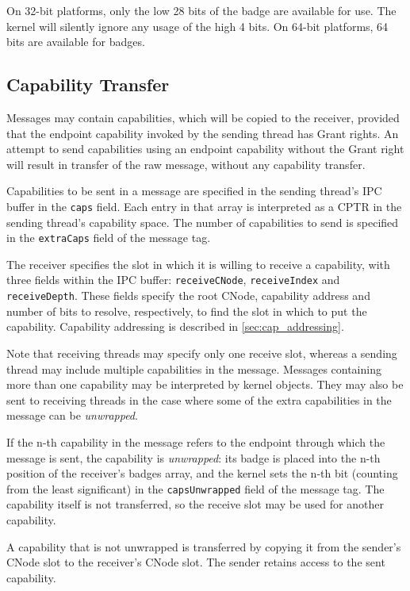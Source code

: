 On 32-bit platforms, only the low 28 bits of the badge are available for use.
The kernel will silently ignore any usage of the high 4 bits.
On 64-bit platforms, 64 bits are available for badges.

\subsection{Capability Transfer}
\label{sec:cap-transfer}

Messages may contain capabilities, which will be copied to the
receiver, provided that the endpoint capability
invoked by the sending thread has Grant rights. An attempt to send
capabilities using an endpoint capability without the Grant right will
result in transfer of the raw message, without any capability transfer.

Capabilities to be sent in a message are specified in the sending thread's
IPC buffer in the \texttt{caps} field. Each entry in that array is interpreted
as a CPTR in the sending thread's capability space. The number of capabilities
to send is specified in the \texttt{extraCaps} field of the message tag.

The receiver specifies the slot
in which it is willing to receive a capability, with three fields within the IPC buffer: \texttt{receiveCNode}, \texttt{receiveIndex} and \texttt{receiveDepth}.
These fields specify the root CNode, capability address and number of bits to resolve, respectively, to find
the slot in which to put the capability. Capability
addressing is described in \autoref{sec:cap_addressing}.

Note that receiving threads may specify only one receive slot, whereas a
sending thread may include multiple capabilities in the message. Messages
containing more than one capability may be interpreted by kernel objects. They
may also be sent to receiving threads in the case where some of the extra
capabilities in the message can be \emph{unwrapped}.

If the n-th capability in the message refers to the endpoint through
which the message is sent, the capability is \emph{unwrapped}: its badge is placed into
the n-th
position of the receiver's badges array, and the kernel sets the n-th bit (counting from the
least significant) in the \texttt{capsUnwrapped} field of the message
tag. The capability itself is not transferred, so the receive slot may be used
for another capability.

A capability that is not unwrapped is transferred by copying it from the
sender's CNode slot to the receiver's CNode slot. The sender retains access
to the sent capability.

